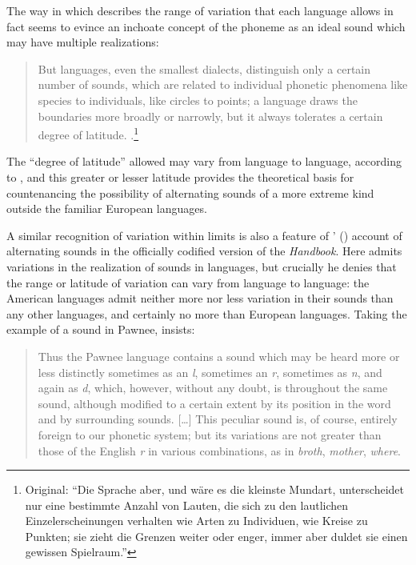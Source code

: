 \documentclass[output=paper]{langscibook}
\begin{document}
The way in which {\Gabelentz} describes the range of variation that each language allows in fact seems to evince an inchoate concept of the phoneme as an ideal sound which may have multiple realizations:

\begin{quotation}
But languages, even the smallest dialects, distinguish only a certain number of sounds, which are related to individual phonetic phenomena like species to individuals, like circles to points; a language draws the boundaries more broadly or narrowly, but it always tolerates a certain degree of latitude. \citep[35]{Gabelentz20161891}.\footnote{Original: ``Die Sprache aber, und wäre es die kleinste Mundart, unterscheidet nur eine bestimmte Anzahl von Lauten, die sich zu den lautlichen Einzelerscheinungen verhalten wie Arten zu Individuen, wie Kreise zu Punkten; sie zieht die Grenzen weiter oder enger, immer aber duldet sie einen gewissen Spielraum.''}
\end{quotation}
 
The ``degree of latitude'' allowed may vary from language to language, according to \citet[197--198]{Gabelentz20161891}, and this greater or lesser latitude provides the theoretical basis for countenancing the possibility of alternating sounds of a more extreme kind outside the familiar European languages.

A similar recognition of variation within limits is also a feature of {\Boas}' (\citeyear{Boas1911}) account of alternating sounds in the officially codified version of the \emph{Handbook}. Here {\Boas} admits variations in the realization of sounds in languages, but crucially he denies that the range or latitude of variation can vary from language to language: the American languages admit neither more nor less variation in their sounds than any other languages, and certainly no more than European languages. Taking the example of a sound in Pawnee, \citet[17]{Boas1911} insists:

\begin{quotation}
Thus the Pawnee language contains a sound which may be heard more or less distinctly sometimes as an \emph{l}, sometimes an \emph{r}, sometimes as \emph{n}, and again as \emph{d}, which, however, without any doubt, is throughout the same sound, although modified to a certain extent by its position in the word and by surrounding sounds. […] This peculiar sound is, of course, entirely foreign to our phonetic system; but its variations are not greater than those of the English \emph{r} in various combinations, as in \emph{broth}, \emph{mother}, \emph{where}. \citep[17]{Boas1911}
\end{quotation}
\end{document}
